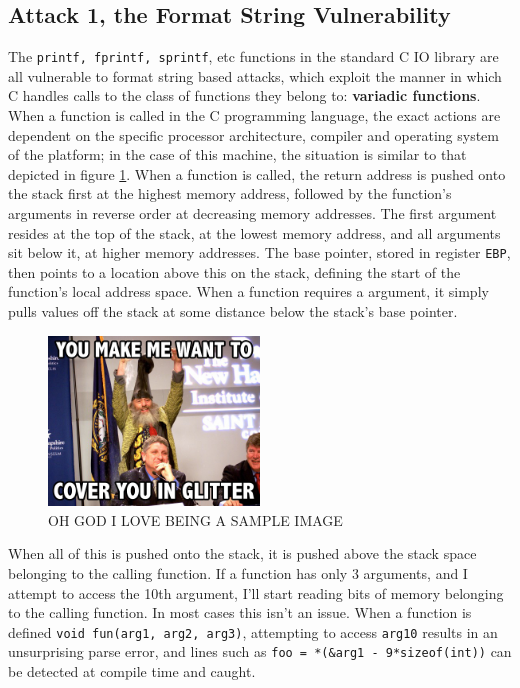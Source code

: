 \subsection{Attack 1, the Format String Vulnerability}

The {\tt printf, fprintf, sprintf}, etc functions in the standard C IO library are all vulnerable to format string based
attacks, which exploit the manner in which C handles calls to the class of functions they belong to: \textbf{variadic
functions}\cite{vfunc}. When a function is called in the C programming language,
the exact actions are dependent on the specific processor architecture, compiler and operating system of the platform;
in the case of this machine, the situation is similar to that depicted in figure \ref{fig_stack}. When a function is
called, the return address is pushed onto the stack first at the highest memory address, followed by the function's
arguments in reverse order at decreasing memory addresses. The first argument resides at the top of the stack, at the
lowest memory address, and all arguments sit below it, at higher memory addresses. The base pointer, stored in register
{\tt EBP}, then points to a location above this on the stack, defining the start of the function's local address space.
When a function requires a argument, it simply pulls values off the stack at some distance below the stack's base
pointer.

\begin{figure}[ht]
    \centering
    \includegraphics[width = 0.5\textwidth]{./images/placeholder.jpg}
    \caption{OH GOD I LOVE BEING A SAMPLE IMAGE}
    \label{fig_stack}
\end{figure}

When all of this is pushed onto the stack, it is pushed above the stack space belonging to the calling function. If a
function has only 3 arguments, and I attempt to access the 10th argument, I'll start reading bits of memory belonging to
the calling function. In most cases this isn't an issue. When a function is defined {\tt void fun(arg1, arg2, arg3)},
attempting to access {\tt arg10} results in an unsurprising parse error, and lines such as {\tt foo =
*(\&arg1 - 9*sizeof(int))} can be detected at compile time and caught.

